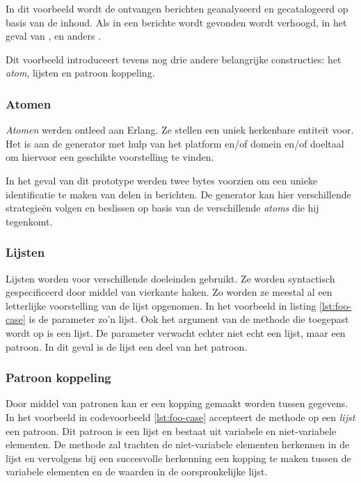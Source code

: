 In dit voorbeeld wordt de ontvangen berichten geanalyseerd en gecatalogeerd op
basis van de inhoud. Als in een berichte  wordt gevonden wordt
 verhoogd, in het geval van , 
en anders .

Dit voorbeeld introduceert tevens nog drie andere belangrijke constructies: het
\emph{atom}, lijsten en patroon koppeling.

\subsubsection{Atomen}

\emph{Atomen} werden ontleed aan Erlang. Ze stellen een uniek herkenbare
entiteit voor. Het is aan de generator met hulp van het platform en/of domein
en/of doeltaal om hiervoor een geschikte voorstelling te vinden.

In het geval van dit prototype werden twee bytes voorzien om een unieke
identificatie te maken van delen in berichten. De generator kan hier
verschillende strategie\"en volgen en beslissen op basis van de verschillende
\emph{atoms} die hij tegenkomt.

\subsubsection{Lijsten}

Lijsten worden voor verschillende doeleinden gebruikt. Ze worden syntactisch
gespecificeerd door middel van vierkante haken. Zo worden ze meestal al een
letterlijke voorstelling van de lijst opgenomen. In het voorbeeld in listing
\ref{lst:foo-case} is de  parameter zo'n lijst. Ook het argument
van de  methode die toegepast wordt op  is een
lijst. De parameter verwacht echter niet echt een lijst, maar een patroon. In
dit geval is de lijst een deel van het patroon.

\subsubsection{Patroon koppeling}

Door middel van patronen kan er een kopping gemaakt worden tussen gegevens. In
het voorbeeld in codevoorbeeld \ref{lst:foo-case} accepteert de 
methode op een \emph{lijst} een patroon. Dit patroon is een lijst en bestaat
uit variabele en niet-variabele elementen. De  methode zal
trachten de niet-variabele elementen herkennen in de lijst en vervolgens bij
een succesvolle herkenning een kopping te maken tussen de variabele elementen
en de waarden in de oorspronkelijke lijst.

